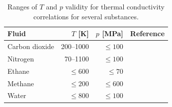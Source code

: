 \begin{table}[H]
 \caption{\label{tab-eos-hc}Ranges of $T$ and $p$ validity for thermal conductivity correlations for several substances.}
 \begin{center}
  \begin{tabular}{lrrl}
 \toprule
   Fluid 		& $T$ [K] 		& $p$ [MPa] 			& Reference \\
  \midrule
  Carbon dioxide 	& 200--1000		& $\leq{100}$ 			& \cite{FenWakVes:98}\\
  Nitrogen       	& 70--1100		& $\leq{100}$		 	& \cite{SteKraLae:87}\\  
  Ethane         	& $\leq{600}$	& $\leq{70}$		 	& \cite{YouEly:87}\\ 
  Methane       	& $\leq{200}$ 	& $\leq{600}$		 	& \cite{YouEly:87}\\  
  Water          	& $\leq{800}$ 	& $\leq{100}$		 	& \cite{IAPWS:08b}\\
  \bottomrule
 \end{tabular}
 \end{center}
\end{table}

